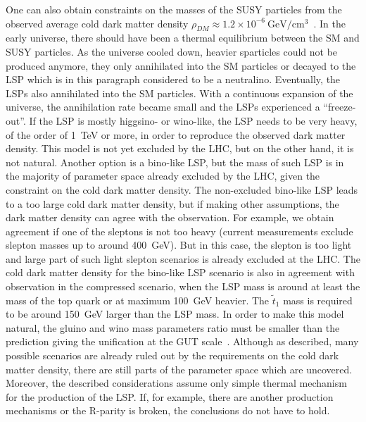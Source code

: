 One can also obtain constraints on the masses of the SUSY particles from the observed average cold dark matter density $\rho_{DM} \approx 1.2 \times 10^{-6}~\mathrm{GeV/cm^{3}}$~\cite{Ade:2015xua, Patrignani:2016xqp}.  In the early universe, there should have been a  thermal equilibrium between the SM and SUSY particles. As the universe cooled down, heavier sparticles could not be produced anymore, they only annihilated into the SM particles or decayed to the LSP which is in this paragraph considered to be a neutralino. Eventually, the LSPs also annihilated into the SM particles. With a continuous expansion of the universe, the annihilation rate became small and the LSPs experienced a ``freeze-out''. If the LSP is mostly higgsino- or wino-like, the LSP needs to be very heavy, of the order of 1~TeV or more, in order to reproduce the observed dark matter density. This model is not yet excluded by the LHC, but on the other hand, it is not natural. Another option is a bino-like LSP, but the mass of such LSP is in the majority of parameter space already excluded by the LHC, given the constraint on the cold dark matter density. The non-excluded bino-like LSP leads to a too large cold dark matter density, but if making other assumptions, the  dark matter density can agree with the observation.  For example, we obtain agreement if one of the sleptons is not too heavy (current measurements exclude slepton masses up to around 400~GeV).  But in this case, the slepton is too light and large part of such light slepton scenarios is already excluded at the LHC. The cold dark matter density for the bino-like LSP scenario is also in agreement with observation in the compressed scenario, when the LSP mass is around at least the mass of the top quark or at maximum 100~GeV heavier. The $\tilde{t}_{1}$ mass is required to be around 150~GeV larger than the LSP mass. In order to make this  model natural, the gluino and wino mass parameters ratio must be smaller than the prediction giving the unification at the GUT scale~\cite{Martin:2008aw}. Although as described, many possible scenarios are already ruled out by the requirements on the cold dark matter density, there are still parts of the parameter space which are uncovered. Moreover, the described considerations assume only simple thermal mechanism for the production of the LSP. If, for example, there are another production mechanisms or the R-parity is broken, the conclusions do not have to hold.

